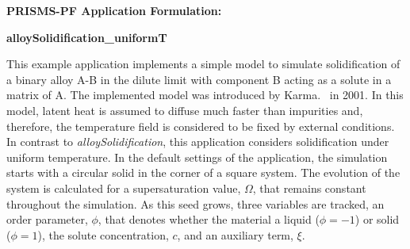 \documentclass[10pt]{article}
\begin{document}
\def\Bomega{\mbox{\boldmath$\omega$}}
\def\Bvarepsilon{\mbox{\boldmath$\varepsilon$}}
\def\Bvartheta{\mbox{\boldmath$\vartheta$}}
\def\Bvarpi{\mbox{\boldmath$\varpi$}}
\def\Bvarrho{\mbox{\boldmath$\varrho$}}
\def\Bvarsigma{\mbox{\boldmath$\varsigma$}}
\def\Bvarphi{\mbox{\boldmath$\varphi$}}
\def\bone{\mathbf{1}}
\def\bzero{\mathbf{0}}
\def\bA{\mbox{\boldmath$ A$}}
\def\bB{\mbox{\boldmath$ B$}}
\def\bC{\mbox{\boldmath$ C$}}
\def\bD{\mbox{\boldmath$ D$}}
\def\bE{\mbox{\boldmath$ E$}}
\def\bF{\mbox{\boldmath$ F$}}
\def\bG{\mbox{\boldmath$ G$}}
\def\bH{\mbox{\boldmath$ H$}}
\def\bI{\mbox{\boldmath$ I$}}
\def\bJ{\mbox{\boldmath$ J$}}
\def\bK{\mbox{\boldmath$ K$}}
\def\bL{\mbox{\boldmath$ L$}}
\def\bM{\mbox{\boldmath$ M$}}
\def\bN{\mbox{\boldmath$ N$}}
\def\bO{\mbox{\boldmath$ O$}}
\def\bP{\mbox{\boldmath$ P$}}
\def\bQ{\mbox{\boldmath$ Q$}}
\def\bR{\mbox{\boldmath$ R$}}
\def\bS{\mbox{\boldmath$ S$}}
\def\bT{\mbox{\boldmath$ T$}}
\def\bU{\mbox{\boldmath$ U$}}
\def\bV{\mbox{\boldmath$ V$}}
\def\bW{\mbox{\boldmath$ W$}}
\def\bX{\mbox{\boldmath$ X$}}
\def\bY{\mbox{\boldmath$ Y$}}
\def\bZ{\mbox{\boldmath$ Z$}}
\def\ba{\mbox{\boldmath$ a$}}
\def\bb{\mbox{\boldmath$ b$}}
\def\bc{\mbox{\boldmath$ c$}}
\def\bd{\mbox{\boldmath$ d$}}
\def\be{\mbox{\boldmath$ e$}}
\def\bff{\mbox{\boldmath$ f$}}
\def\bg{\mbox{\boldmath$ g$}}
\def\bh{\mbox{\boldmath$ h$}}
\def\bi{\mbox{\boldmath$ i$}}
\def\bj{\mbox{\boldmath$ j$}}
\def\bk{\mbox{\boldmath$ k$}}
\def\bl{\mbox{\boldmath$ l$}}
\def\bm{\mbox{\boldmath$ m$}}
\def\bn{\mbox{\boldmath$ n$}}
\def\bo{\mbox{\boldmath$ o$}}
\def\bp{\mbox{\boldmath$ p$}}
\def\bq{\mbox{\boldmath$ q$}}
\def\br{\mbox{\boldmath$ r$}}
\def\bs{\mbox{\boldmath$ s$}}
\def\bt{\mbox{\boldmath$ t$}}
\def\bu{\mbox{\boldmath$ u$}}
\def\bv{\mbox{\boldmath$ v$}}
\def\bw{\mbox{\boldmath$ w$}}
\def\bx{\mbox{\boldmath$ x$}}
\def\by{\mbox{\boldmath$ y$}}
\def\bz{\mbox{\boldmath$ z$}}
\centerline{\Large{\bf PRISMS-PF Application Formulation:}}
\smallskip
\centerline{\Large{\bf alloySolidification\_uniformT}}
\bigskip
This example application implements a simple model to simulate solidification of a binary alloy A-B in the dilute limit with component B acting as a solute in a matrix of A. The implemented model was introduced by Karma.~\cite{Karma2001} in 2001. In this model, latent heat is assumed to diffuse much faster than impurities and, therefore, the temperature field is considered to be fixed by external conditions. In contrast to {\it alloySolidification}, this application considers solidification under uniform temperature.  In the default settings of the application, the simulation starts with a circular solid in the corner of a square system. The evolution of the system is calculated for a supersaturation value, $\Omega$, that remains constant throughout the simulation. As this seed grows, three variables are tracked, an order parameter, $\phi$, that denotes whether the material a liquid ($\phi=-1$) or solid ($\phi=1$), the solute concentration, $c$, and an auxiliary term, $\xi$. 
\end{document}
